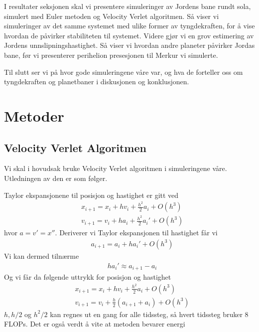 \documentclass[reprint,english,notitlepage]{revtex4-1}
\begin{document}
	I resultater seksjonen skal vi presentere simuleringer av Jordens bane rundt sola, simulert med Euler metoden og Velocity Verlet algoritmen. Så viser vi simuleringer av det samme systemet med ulike former av tyngdekraften, for å vise hvordan de påvirker stabiliteten til systemet. Videre gjør vi en grov estimering av Jordens unnslipningshastighet. Så viser vi hvordan andre planeter påvirker Jordas bane, før vi presenterer perihelion presesjonen til Merkur vi simulerte.
	
	Til slutt ser vi på hvor gode simuleringene våre var, og hva de forteller oss om tyngdekraften og planetbaner i diskusjonen og konklusjonen.

\section{Metoder} %
	
	
\subsection{Velocity Verlet Algoritmen}
	Vi skal i hovudsak bruke Velocity Verlet algoritmen i simuleringene våre. Utledningen av den er som følger.
	
	Taylor ekspansjonene til posisjon og hastighet er gitt ved
	\begin{equation}
	\label{eq:taylor}
	\begin{aligned}
	&x_{i+1} = x_i + h v_i + \frac{h^2}{2}a_i + O(h^3) \\
	&v_{i+1} = v_i + h a_i + \frac{h^2}{2}a_i' + O(h^3)
	\end{aligned}
	\end{equation}
	hvor $a = v' = x''$. Deriverer vi Taylor ekspansjonen til hastighet får vi
	\begin{equation*}
	\begin{aligned}
	&a_{i+1} = a_i + h a_i' + O(h^3)
	\end{aligned}
	\end{equation*}
	Vi kan dermed tilnærme
	\begin{equation*}
	\begin{aligned}
	&ha_{i}' \approx a_{i + 1} - a_i
	\end{aligned}
	\end{equation*}
	Og vi får da følgende uttrykk for posisjon og hastighet
	\begin{equation*}
	\begin{aligned}
	&x_{i+1} = x_i + hv_i + \frac{h^2}{2}a_i + O(h^3) \\
	&v_{i+1} = v_i + \frac{h}{2}(a_{i+1} + a_i) + O(h^3)
	\end{aligned}
	\end{equation*}
	$h, h/2$ og $h^2/2$ kan regnes ut en gang for alle tidssteg, så hvert tidssteg bruker 8 FLOPs. Det er også verdt å vite at metoden bevarer energi \cite{energi}
	
\end{document}
